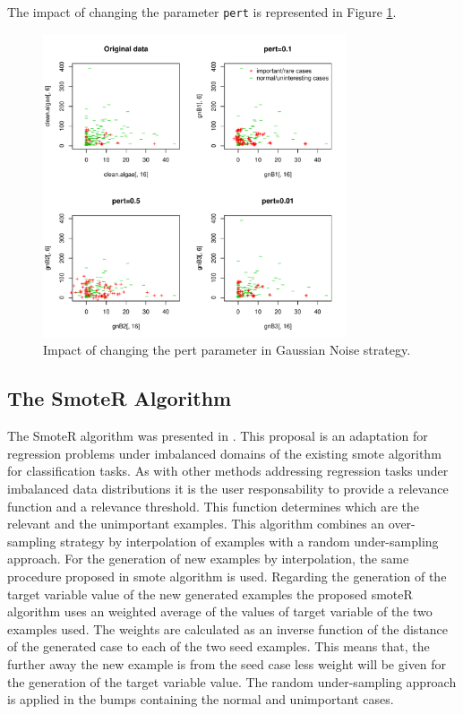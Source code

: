 \documentclass[10pt,a4paper]{article}\usepackage[]{graphicx}\usepackage[]{color}
\newenvironment{knitrout}{}{} %
\begin{document}
The impact of changing the parameter \texttt{pert} is represented in Figure \ref{fig:GN_plot3}.
\begin{knitrout}\footnotesize
{}\color{fgcolor}\begin{figure}

{\centering \includegraphics[width=0.8\textwidth]{figures/UBL-GN_plot3-1} 

}

\caption[Impact of changing the pert parameter in Gaussian Noise strategy]{Impact of changing the pert parameter in Gaussian Noise strategy.}\label{fig:GN_plot3}
\end{figure}


\end{knitrout}


\subsection{The SmoteR Algorithm}\label{sec:smoteR}

The SmoteR algorithm was presented in \cite{torgo2013smote}. This proposal is an adaptation for regression problems under imbalanced domains of the existing smote algorithm for classification tasks. As with other methods addressing regression tasks under imbalanced data distributions it is the user responsability to provide a relevance function and a relevance threshold. This function determines which are the relevant and the unimportant examples. This algorithm combines an over-sampling strategy by interpolation of examples with a random under-sampling approach. For the generation of new examples by interpolation, the same procedure proposed in smote algorithm is used. Regarding the generation of the target variable value of the new generated examples the proposed smoteR algorithm uses an weighted average of the values of target variable of the two examples used. The weights are calculated as an inverse function of the distance of the generated case to each of the two seed examples. This means that, the further away the new example is from the seed case less weight will be given for the generation of the target variable value. The random under-sampling approach is applied in the bumps containing the normal and unimportant cases. 
\end{document}
